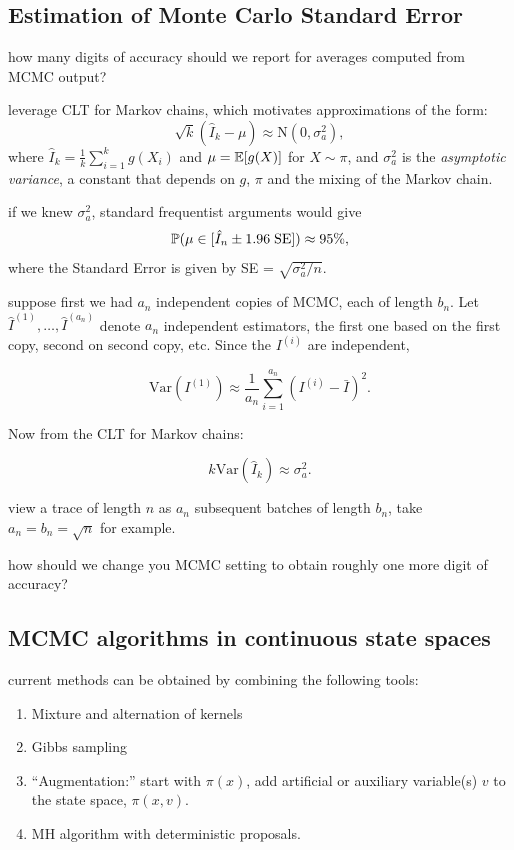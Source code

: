 \documentclass{article}
\begin{document}
\subsection{Estimation of Monte Carlo Standard Error}

 how many digits of accuracy should we report for averages computed from MCMC output?

 leverage CLT for Markov chains, which motivates approximations of the form:
\[ \sqrt{k} (\hat I_k - \mu) \approx \text{N}(0, \sigma^2_a), \]
where $\hat I_k = \frac{1}{k} \sum_{i=1}^k g(X_i)$ and $\mu = \E[g(X)]$ for $X \sim \pi$, and $\sigma^2_a$ is the \emph{asymptotic variance}, a constant that depends on $g$, $\pi$ and the mixing of the Markov chain.

 if we knew $\sigma^2_a$, standard frequentist arguments would give \[\P(\mu \in [\hat I_n \pm 1.96\; \text{SE}]) \approx 95\%,\] where the Standard Error is given by SE = $\sqrt{\sigma^2_a/n}$. 

 suppose first we had $a_n$ independent copies of MCMC, each of length $b_n$. Let $\hat I^{(1)}, \dots, \hat I^{(a_n)}$ denote  $a_n$ independent estimators, the first one based on the first copy, second on second copy, etc. Since the $I^{(i)}$ are independent, 

\[ \text{Var}(I^{(1)}) \approx \frac{1}{a_n} \sum_{i = 1}^{a_n} (I^{(i)} - \bar I)^2. \]

Now from the CLT for Markov chains: 

\[ k \text{Var}(\hat I_k) \approx \sigma_a^2. \]

 view a trace of length $n$ as $a_n$ subsequent batches of length $b_n$, take $a_n = b_n = \sqrt{n}$ for example. 

 how should we change you MCMC setting to obtain roughly one more digit of accuracy? 

\subsection{MCMC algorithms in continuous state spaces}

 current methods can be obtained by combining the following tools:
\begin{enumerate}
	\item Mixture and alternation of kernels 
	\item Gibbs sampling 
	\item ``Augmentation:'' start with $\pi(x)$, add artificial or auxiliary variable(s) $v$ to the state space, $\pi(x, v)$.
	\item  MH algorithm with deterministic proposals. 
\end{enumerate}
\end{document}
